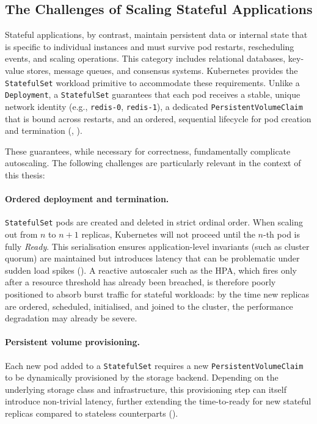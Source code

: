 \subsection{The Challenges of Scaling Stateful Applications}
\label{subsec:stateful-challenges}

Stateful applications, by contrast, maintain persistent data or internal state
that is specific to individual instances and must survive pod restarts,
rescheduling events, and scaling operations. This category includes relational
databases, key-value stores, message queues, and consensus systems. Kubernetes
provides the \texttt{StatefulSet} workload primitive to accommodate these
requirements. Unlike a \texttt{Deployment}, a \texttt{StatefulSet} guarantees
that each pod receives a stable, unique network identity (e.g.,
\texttt{redis-0}, \texttt{redis-1}), a dedicated
\texttt{PersistentVolumeClaim} that is bound across restarts, and an ordered,
sequential lifecycle for pod creation and termination
(\cite{kubernetes:statefulsets}, \cite{portworx:statefulsets}).

These guarantees, while necessary for correctness, fundamentally complicate
autoscaling. The following challenges are particularly relevant in the context
of this thesis:

\paragraph{Ordered deployment and termination.}
\texttt{StatefulSet} pods are created and deleted in strict ordinal order.
When scaling out from $n$ to $n+1$ replicas, Kubernetes will not proceed until
the $n$-th pod is fully \textit{Ready}. This serialisation ensures application-level
invariants (such as cluster quorum) are maintained but introduces latency that
can be problematic under sudden load spikes (\cite{kubernetes:statefulsets}).
A reactive autoscaler such as the HPA, which fires only after a resource
threshold has already been breached, is therefore poorly positioned to absorb
burst traffic for stateful workloads: by the time new replicas are ordered,
scheduled, initialised, and joined to the cluster, the performance degradation
may already be severe.

\paragraph{Persistent volume provisioning.}
Each new pod added to a \texttt{StatefulSet} requires a new
\texttt{PersistentVolumeClaim} to be dynamically provisioned by the storage
backend. Depending on the underlying storage class and infrastructure, this
provisioning step can itself introduce non-trivial latency, further extending
the time-to-ready for new stateful replicas compared to stateless counterparts
(\cite{portworx:statefulsets}).

